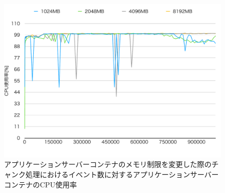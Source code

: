 \documentclass[../../../../../main]{subfiles}
\begin{document}
    \begin{figure}[H]
        \centering
        \includegraphics[width=12cm]{graph}
        \caption{アプリケーションサーバーコンテナのメモリ制限を変更した際のチャンク処理におけるイベント数に対するアプリケーションサーバーコンテナのCPU使用率}
        \label{fig:stream-change-app-memory-limit-app-cpu-app_4_db_1_1024}
    \end{figure}
\end{document}
